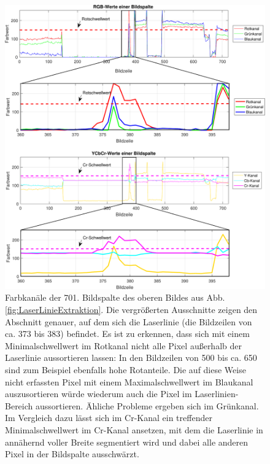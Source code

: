\begin{figure}
\centering \includegraphics[width=\textwidth]{images/ColorAugmented4.pdf}
\caption[Farbkanäle einer einzelnen Bildspalte]{Farbkanäle der 701. Bildspalte des oberen Bildes aus Abb. \ref{fig:LaserLinieExtraktion}. Die vergrößerten Ausschnitte zeigen den Abschnitt genauer, auf dem sich die Laserlinie (die Bildzeilen von ca. 373 bis 383) befindet. Es ist zu erkennen, dass sich mit einem Minimalschwellwert im Rotkanal nicht alle Pixel außerhalb der Laserlinie aussortieren lassen: In den Bildzeilen von 500 bis ca. 650 sind zum Beispiel ebenfalls hohe Rotanteile. Die auf diese Weise nicht erfassten Pixel mit einem Maximalschwellwert im Blaukanal auszusortieren würde wiederum auch die Pixel im Laserlinien-Bereich aussortieren. Ähliche Probleme ergeben sich im Grünkanal. Im Vergleich dazu lässt sich im Cr-Kanal ein treffender Minimalschwellwert im Cr-Kanal ansetzen, mit dem die Laserlinie in annähernd voller Breite segmentiert wird und dabei alle anderen Pixel in der Bildspalte ausschwärzt.}\label{fig:farbwerte}
\end{figure}

